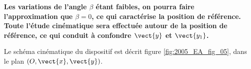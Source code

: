 \textbf{Les variations de l’angle $\beta$ étant faibles, on pourra faire l’approximation que $\beta=0$, ce qui caractérise la position de référence.
Toute l’étude cinématique sera effectuée autour de la position de référence, ce qui conduit à confondre $\vect{y}$ et $\vect{y_1}$. }

Le schéma cinématique du dispositif est décrit figure \ref{fig:2005_EA_fig_05}, dans le plan $\left(O,\vect{x},\vect{y}\right)$.
\fi



%
%
%

